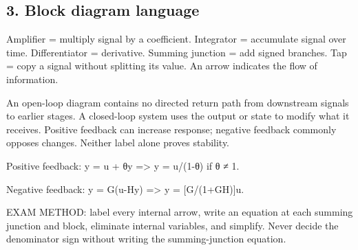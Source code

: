 \documentclass[11pt,a4paper]{article}
\begin{document}
\subsection{3. Block diagram language}
\begin{conceptbox}Amplifier = multiply signal by a coefficient. Integrator = accumulate signal over time. Differentiator = derivative. Summing junction = add signed branches. Tap = copy a signal without splitting its value. An arrow indicates the flow of information.\end{conceptbox}
\begin{conceptbox}An open-loop diagram contains no directed return path from downstream signals to earlier stages. A closed-loop system uses the output or state to modify what it receives. Positive feedback can increase response; negative feedback commonly opposes changes. Neither label alone proves stability.\end{conceptbox}
\begin{equationbox}\raggedright
{\ttfamily\small Positive feedback: y = u + θy => y = u/(1-θ) if θ ≠ 1.}\par
\end{equationbox}
\begin{equationbox}\raggedright
{\ttfamily\small Negative feedback: y = G(u-Hy) => y = [G/(1+GH)]u.}\par
\end{equationbox}
\begin{exambox}EXAM METHOD: label every internal arrow, write an equation at each summing junction and block, eliminate internal variables, and simplify. Never decide the denominator sign without writing the summing-junction equation.\end{exambox}
\end{document}
